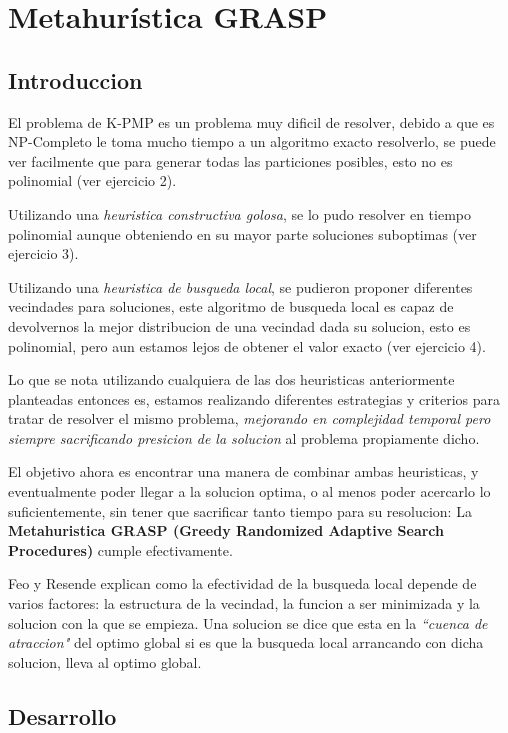 \documentclass[10pt,a4paper]{article}
\begin{document}
\section{Metahurística GRASP}
\subsection{Introduccion}
El problema de K-PMP es un problema muy dificil de resolver, debido a que es NP-Completo le toma mucho tiempo a un algoritmo exacto resolverlo, se puede ver facilmente que para generar todas las particiones posibles, esto no es polinomial (ver ejercicio 2). 

\bigskip
Utilizando una \textit{heuristica constructiva golosa}, se lo pudo resolver en tiempo polinomial aunque obteniendo en su mayor parte soluciones suboptimas  (ver ejercicio 3).

\bigskip
Utilizando una \textit{heuristica de busqueda local}, se pudieron proponer diferentes vecindades para soluciones, este algoritmo de busqueda local es capaz de devolvernos la mejor distribucion de una vecindad dada su solucion, esto es polinomial, pero aun estamos lejos de obtener el valor exacto (ver ejercicio 4).

\bigskip
Lo que se nota utilizando cualquiera de las dos heuristicas anteriormente planteadas entonces es, estamos realizando diferentes estrategias y criterios para tratar de resolver el mismo problema, \textit{mejorando en complejidad temporal pero siempre  sacrificando presicion de la solucion} al problema propiamente dicho.

\bigskip
El objetivo ahora es encontrar una manera de combinar ambas heuristicas, y eventualmente poder llegar a la solucion optima, o al menos poder acercarlo lo suficientemente, sin tener que sacrificar tanto tiempo para su resolucion: La \textbf{Metahuristica GRASP (Greedy Randomized Adaptive Search Procedures)} cumple efectivamente.

\bigskip
Feo y Resende explican como la efectividad de la busqueda local depende de varios factores: la estructura de la vecindad, la funcion a ser minimizada y la solucion con la que se empieza. Una solucion se dice que esta en la \textit{``cuenca de atraccion"} del optimo global si es que la busqueda local arrancando con dicha solucion, lleva al optimo global.

\subsection{Desarrollo}
\end{document}
